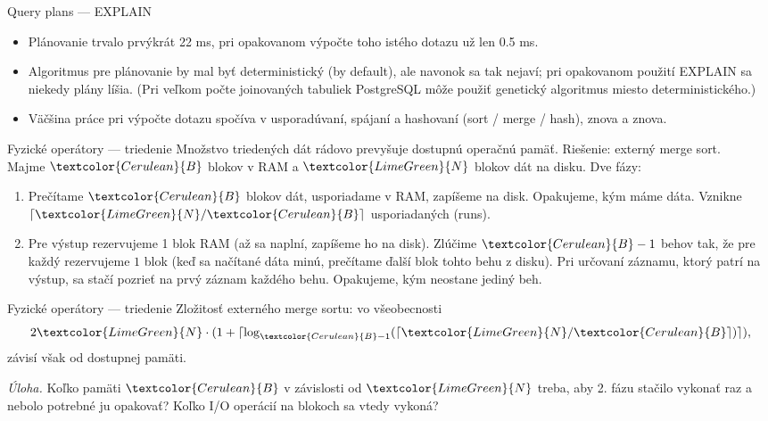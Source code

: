 \documentclass[12pt]{beamer}
\def\blue#1{\textcolor{Cerulean}{#1}}
\def\green#1{\textcolor{LimeGreen}{#1}}
\begin{document}
\begin{frame}[fragile]{Query plans --- EXPLAIN}
\begin{itemize}
\item Plánovanie trvalo prvýkrát 22 ms, pri opakovanom výpočte toho istého dotazu už len 0.5 ms.
\item Algoritmus pre plánovanie by mal byť deterministický (by default), ale navonok sa tak nejaví;
    pri opakovanom použití EXPLAIN sa niekedy plány líšia. (Pri veľkom počte joinovaných tabuliek PostgreSQL
    môže použiť genetický algoritmus miesto deterministického.)
\item Väčšina práce pri výpočte dotazu spočíva v usporadúvaní, spájaní a hashovaní (sort / merge / hash), znova a znova.
\end{itemize}
\end{frame}

\begin{frame}[fragile]{Fyzické operátory --- triedenie}
Množstvo triedených dát rádovo prevyšuje dostupnú operačnú pamäť. Riešenie: \alert{externý merge sort}.\\
Majme $\blue{B}$ blokov v RAM a $\green{N}$ blokov dát na disku. Dve fázy:
\begin{enumerate}
  \item Prečítame $\blue{B}$ blokov dát, usporiadame v RAM, zapíšeme na disk.
      Opakujeme, kým máme dáta. Vznikne $\lceil \green{N}/\blue{B}\rceil$ usporiadaných  (runs).
  \item Pre výstup rezervujeme 1 blok RAM (až sa naplní, zapíšeme ho na disk).
      Zlúčime $\blue{B}-1$ behov tak, že pre každý rezervujeme $1$ blok
      (keď sa načítané dáta minú, prečítame ďalší blok tohto behu z disku).
      Pri určovaní záznamu, ktorý patrí na výstup, sa stačí pozrieť na prvý záznam každého behu.
      Opakujeme, kým neostane jediný beh.
\end{enumerate}
\end{frame}

\begin{frame}[fragile]{Fyzické operátory --- triedenie}
Zložitosť externého merge sortu: vo všeobecnosti
$$
2\green{N} \cdot (1 + \lceil\log_{\blue{B}-1} (\lceil \green{N}/\blue{B}\rceil)\rceil),
$$
závisí však od dostupnej pamäti.
\bigskip

\emph{Úloha.}
Koľko pamäti $\blue{B}$ v závislosti od $\green{N}$ treba,
aby 2. fázu stačilo vykonať raz a nebolo potrebné ju opakovať?
Koľko I/O operácií na blokoch sa vtedy vykoná?
\end{frame}
\end{document}
